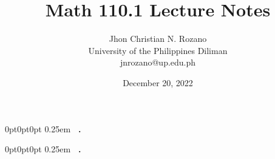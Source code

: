 \usepackage{hyperref}
\hypersetup{
    colorlinks=true, %
    linktoc=all,  %
    linkcolor=black,  %
}

\title{\textbf{Math 110.1 Lecture Notes}}
\author{Jhon Christian N. Rozano \\
    University of the Philippines Diliman \\
    \small{jnrozano@up.edu.ph}}
\date{December 20, 2022}

\usepackage[shortlabels]{enumitem}

\usepackage[many]{tcolorbox}
\usepackage{lipsum}

\usepackage{changepage}
\newenvironment{myspace}{\begin{adjustwidth}{1cm}{}}{\end{adjustwidth}}

\makeatletter

\makeatletter

\def\renewtheorem#1{
    \expandafter\let\csname#1\endcsname\relax
    \expandafter\let\csname c@#1\endcsname\relax
    \gdef\renewtheorem@envname{#1}
    \renewtheorem@secpar
}
\def\renewtheorem@secpar{\@ifnextchar[{\renewtheorem@numberedlike}{\renewtheorem@nonumberedlike}}
\def\renewtheorem@numberedlike[#1]#2{\newtheorem{\renewtheorem@envname}[#1]{#2}}
\def\renewtheorem@nonumberedlike#1{
    \def\renewtheorem@caption{#1}
    \edef\renewtheorem@nowithin{\noexpand\newtheorem{\renewtheorem@envname}{\renewtheorem@caption}}
    \renewtheorem@thirdpar
}
\def\renewtheorem@thirdpar{\@ifnextchar[{\renewtheorem@within}{\renewtheorem@nowithin}}
\def\renewtheorem@within[#1]{\renewtheorem@nowithin[#1]}

\makeatother


\makeatother

{0pt}{0pt}{\normalfont}{0pt}
{}{\;}{0.25em}
{{\bfseries{}~.}
}

{0pt}{0pt}{\normalfont}{0pt}
{}{\;}{0.25em}
{{\bfseries{}~.}
}

